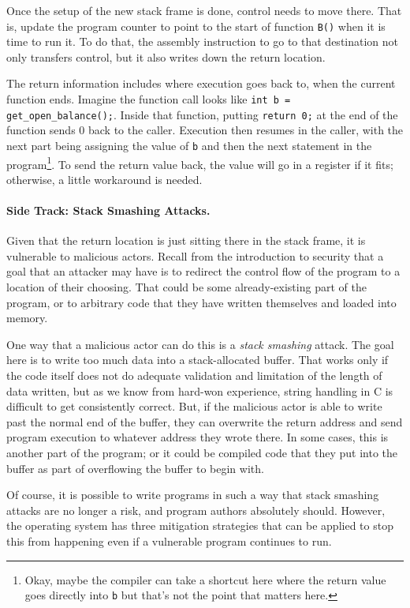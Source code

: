 Once the setup of the new stack frame is done, control needs to move there. That is, update the program counter to point to the start of function \texttt{B()} when it is time to run it. To do that, the assembly instruction to go to that destination not only transfers control, but it also writes down the return location.

The return information includes where execution goes back to, when the current function ends. Imagine the function call looks like \texttt{int b = get\_open\_balance();}. Inside that function, putting \texttt{return 0;} at the end of the function sends 0 back to the caller. Execution then resumes in the caller, with the next part being assigning the value of \texttt{b} and then the next statement in the program\footnote{Okay, maybe the compiler can take a shortcut here where the return value goes directly into \texttt{b} but that's not the point that matters here.}. To send the return value back, the value will go in a register if it fits; otherwise, a little workaround is needed. 

\paragraph{Side Track: Stack Smashing Attacks.} Given that the return location is just sitting there in the stack frame, it is vulnerable to malicious actors. Recall from the introduction to security that a goal that an attacker may have is to redirect the control flow of the program to a location of their choosing. That could be some already-existing part of the program, or to arbitrary code that they have written themselves and loaded into memory. 

One way that a malicious actor can do this is a \textit{stack smashing} attack. The goal here is to write too much data into a stack-allocated buffer. That works only if the code itself does not do adequate validation and limitation of the length of data written, but as we know from hard-won experience, string handling in C is difficult to get consistently correct. But, if the malicious actor is able to write past the normal end of the buffer, they can overwrite the return address and send program execution to whatever address they wrote there. In some cases, this is another part of the program; or it could be compiled code that they put into the buffer as part of overflowing the buffer to begin with.

Of course, it is possible to write programs in such a way that stack smashing attacks are no longer a risk, and program authors absolutely should. However, the operating system has three mitigation strategies that can be applied to stop this from happening even if a vulnerable program continues to run.

